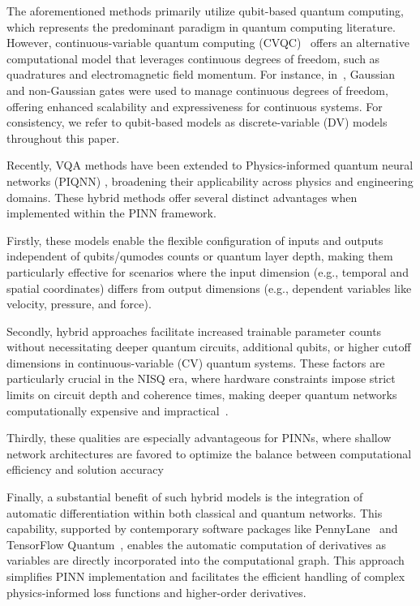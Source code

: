 The aforementioned methods primarily utilize qubit-based quantum computing, which represents the predominant paradigm in quantum computing literature. However, continuous-variable quantum computing (CVQC)~\cite{braunstein2005quantum} offers an alternative computational model that leverages continuous degrees of freedom, such as quadratures and electromagnetic field momentum. For instance, in~\cite{markidis2022physics}, Gaussian and non-Gaussian gates were used to manage continuous degrees of freedom, offering enhanced scalability and expressiveness for continuous systems. For consistency, we refer to qubit-based models as discrete-variable (DV) models throughout this paper.

Recently, VQA methods have been extended to Physics-informed quantum neural networks (PIQNN) \cite{setty2023physics, dehaghani2024hybrid, trahan2024quantum,sedykh2024hybrid, leong2025hybrid}, broadening their applicability across physics and engineering domains. These hybrid methods offer several distinct advantages when implemented within the PINN framework. 

Firstly, these models enable the flexible configuration of inputs and outputs independent of qubits/qumodes counts or quantum layer depth, making them particularly effective for scenarios where the input dimension (e.g., temporal and spatial coordinates) differs from output dimensions (e.g., dependent variables like velocity, pressure, and force).

Secondly, hybrid approaches facilitate increased trainable parameter counts without necessitating deeper quantum circuits, additional qubits, or higher cutoff dimensions in continuous-variable (CV) quantum systems. These factors are particularly crucial in the NISQ era, where hardware constraints impose strict limits on circuit depth and coherence times, making deeper quantum networks computationally expensive and impractical~\cite{preskill2018quantum, bharti2022noisy}. 

Thirdly, these qualities are especially advantageous for PINNs, where shallow network architectures are favored to optimize the balance between computational efficiency and solution accuracy~\cite{krishnapriyan2021characterizing, wang2022approximation, shin2023error, farea2024:arXiv}

Finally, a substantial benefit of such hybrid models is the integration of automatic differentiation within both classical and quantum networks. This capability, supported by contemporary software packages like PennyLane~\cite{bergholm2018pennylane} and TensorFlow Quantum~\cite{broughton2020tensorflow}, enables the automatic computation of derivatives as variables are directly incorporated into the computational graph. This approach simplifies PINN implementation and facilitates the efficient handling of complex physics-informed loss functions and higher-order derivatives.

